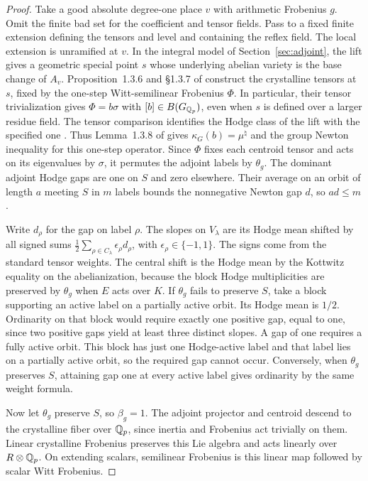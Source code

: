 \begin{proof}
Take a good absolute degree-one place \(v\) with arithmetic Frobenius \(g\).
Omit the finite bad set for the coefficient and tensor fields.
Pass to a fixed finite extension defining the tensors and level and
containing the reflex field. The local extension is unramified at
\(v\). In the integral model of Section~\ref{sec:adjoint}, the lift
gives a geometric special point \(s\) whose underlying abelian variety
is the base change of \(A_v\). Proposition~1.3.6 and \S1.3.7 of
\cite{kmps} construct the crystalline tensors at \(s\), fixed by the
one-step Witt-semilinear Frobenius \(\Phi\). In particular, their
tensor trivialization gives \(\Phi=b\sigma\) with \([b]\in B(G_{\mathbb Q_p})\),
even when \(s\) is defined over a larger residue field. The
tensor comparison identifies the Hodge class of the lift with
the specified one \cite[Theorem~(0.3) and \S5]{blasius}.
Thus Lemma~1.3.8 of \cite{kmps} gives
\(\kappa_G(b)=\mu^\natural\) and the group Newton inequality
for this one-step operator. Since \(\Phi\) fixes each centroid tensor
and acts on its eigenvalues by \(\sigma\), it permutes the adjoint
labels by \(\theta_g\). The dominant adjoint Hodge gaps are one on
\(S\) and zero elsewhere. Their average on an orbit of length \(a\)
meeting \(S\) in \(m\) labels bounds the nonnegative Newton gap \(d\),
so \(ad\le m\).

Write \(d_\rho\) for the gap on label \(\rho\). The slopes on
\(V_\lambda\) are its Hodge mean shifted by all signed sums
\(\frac12\sum_{\rho\in C_\lambda}\epsilon_\rho d_\rho\), with
\(\epsilon_\rho\in\{-1,1\}\). The signs come from the standard tensor
weights. The central shift is the Hodge mean by the Kottwitz equality
on the abelianization, because the block Hodge multiplicities are
preserved by \(\theta_g\) when \(E\) acts over \(K\). If \(\theta_g\)
fails to preserve \(S\), take a block supporting an active label on a
partially active orbit. Its Hodge mean is \(1/2\). Ordinarity on that
block would require exactly one positive gap, equal to one, since
two positive gaps yield at least three distinct slopes. A gap of one
requires a fully active orbit. This block has just one Hodge-active
label and that label lies on a partially active orbit, so the
required gap cannot occur. Conversely, when \(\theta_g\) preserves
\(S\), attaining gap one at every active label gives ordinarity by
the same weight formula.

Now let \(\theta_g\) preserve \(S\), so \(\beta_g=1\). The adjoint
projector and centroid descend to the crystalline fiber over
\(\mathbb Q_p\), since inertia and Frobenius act trivially on them. Linear
crystalline Frobenius preserves this Lie algebra and acts linearly
over \(R\otimes\mathbb Q_p\). On extending scalars, semilinear Frobenius
is this linear map followed by scalar Witt Frobenius.


\end{proof}
